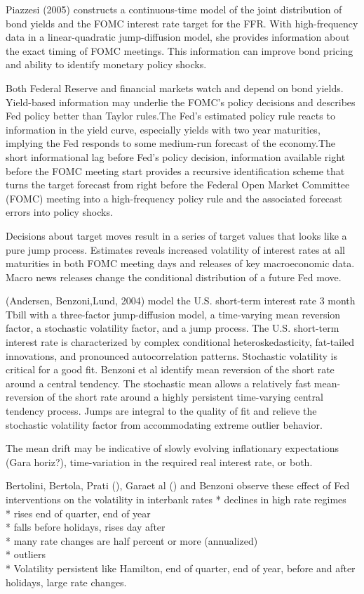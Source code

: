 \documentclass[
]{article}
\begin{document}
Piazzesi (2005) constructs a continuous-time model of the joint distribution of bond yields and the FOMC interest rate target for the FFR. With high-frequency data in a linear-quadratic jump-diffusion model, she provides information about the exact timing of FOMC meetings. This information can improve bond pricing and ability to identify monetary policy shocks.

Both Federal Reserve and financial markets watch and depend on bond yields. Yield-based information may underlie the FOMC's policy decisions and describes Fed policy better than Taylor rules.The Fed's estimated policy rule reacts to information in the yield curve, especially yields with two year maturities, implying the Fed responds to some medium-run forecast of the economy.The short informational lag before Fed's policy decision, information available right before the FOMC meeting start provides a recursive identification scheme that turns the target forecast from right before the Federal Open Market Committee (FOMC) meeting into a high-frequency policy rule and the associated forecast errors into policy shocks.

Decisions about target moves result in a series of target values that looks like a pure jump process. Estimates reveals increased volatility of interest rates at all maturities in both FOMC meeting days and releases of key macroeconomic data. Macro news releases change the conditional distribution of a future Fed move.

(Andersen, Benzoni,Lund, 2004) model the U.S. short-term interest rate 3 month Tbill with a three-factor jump-diffusion model, a time-varying mean reversion factor, a stochastic volatility factor, and a jump process. The U.S. short-term interest rate is characterized by complex conditional heteroskedasticity, fat-tailed innovations, and pronounced autocorrelation patterns. Stochastic volatility is critical for a good fit. Benzoni et al identify mean reversion of the short rate around a central tendency. The stochastic mean allows a relatively fast mean-reversion of the short rate around a highly persistent time-varying central tendency process. Jumps are integral to the quality of fit and relieve the stochastic volatility factor from accommodating extreme outlier behavior.

The mean drift may be indicative of slowly evolving inflationary expectations (Gara horiz?), time-variation in the required real interest rate, or both.

Bertolini, Bertola, Prati (), Garaet al () and Benzoni observe these effect of Fed interventions on the volatility in interbank rates
* declines in high rate regimes\\
* rises end of quarter, end of year\\
* falls before holidays, rises day after\\
* many rate changes are half percent or more (annualized)\\
* outliers\\
* Volatility persistent like Hamilton, end of quarter, end of year, before and after holidays, large rate changes.
\end{document}
